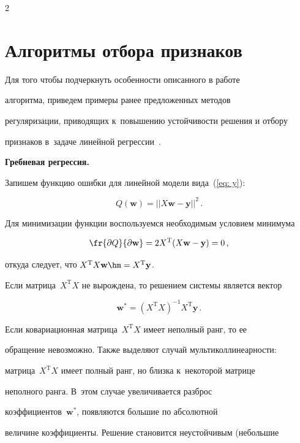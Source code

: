 \begin{multicols}{2}
\section{Алгоритмы отбора признаков}



Для того чтобы подчеркнуть особенности описанного в работе

алгоритма, приведем примеры ранее предложенных методов

регуляризации, приводящих к~повышению устойчивости решения и  отбору

признаков в~задаче линейной регрессии~\cite{lasso, ridzh2}.



\smallskip



\textbf{Гребневая регрессия.}

Запишем функцию ошибки для линейной модели вида~(\ref{eq: y}):

$$

Q(\mathbf{w})=||X\mathbf{w}-\mathbf{y}||^2\,.

$$

Для минимизации функции воспользуемся необходимым условием минимума

$$

\fr{\partial Q}{\partial \mathbf{w}}=2X^{\mathrm{T}}(X\mathbf{w}-\mathbf{y})=0\,,

$$

откуда следует, что $X^{\mathrm{T}}X\mathbf{w}\hm=X^{\mathrm{T}}\mathbf{y}$. 

Если матрица~$X^{\mathrm{T}}X$ не вырождена, то решением системы является вектор

$$

\mathbf{w}^{*}=\left(X^{\mathrm{T}}X\right)^{-1}X^{\mathrm{T}}\mathbf{y}\,.

$$



Если ковариационная матрица~$X^{\mathrm{T}}X$ имеет неполный ранг, то ее

обращение невозможно.  Также выделяют случай мультиколлинеарности:

матрица~$X^{\mathrm{T}}X$ имеет полный ранг, но близка к~некоторой матрице

неполного ранга. В~этом случае увеличивается разброс

коэффициентов~$\mathbf{w}^{*}$, появляются большие по абсолютной

величине коэффициенты. Решение становится неустойчивым (небольшие


\end{multicols}

